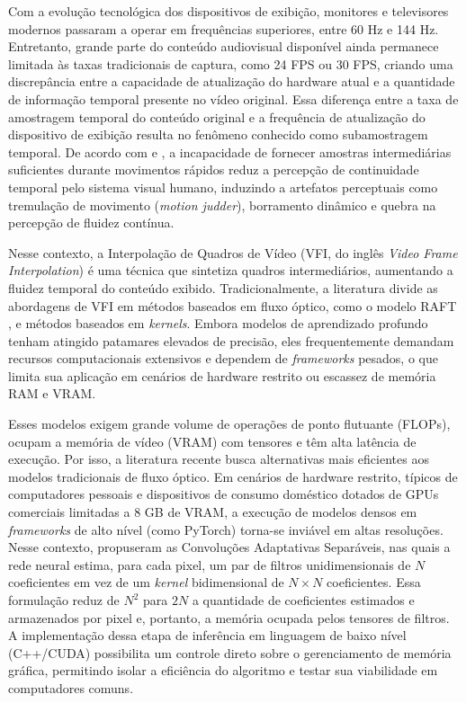 \documentclass[
    12pt,                %
    openright,           %
    oneside,             %
    a4paper,             %
    english,             %
    brazil               %
]{abntex2}
\begin{document}
Com a evolução tecnológica dos dispositivos de exibição, monitores e televisores modernos passaram a operar em frequências superiores, entre 60 Hz e 144 Hz. Entretanto, grande parte do conteúdo audiovisual disponível ainda permanece limitada às taxas tradicionais de captura, como 24 FPS ou 30 FPS, criando uma discrepância entre a capacidade de atualização do hardware atual e a quantidade de informação temporal presente no vídeo original. Essa diferença entre a taxa de amostragem temporal do conteúdo original e a frequência de atualização do dispositivo de exibição resulta no fenômeno conhecido como subamostragem temporal. De acordo com  e , a incapacidade de fornecer amostras intermediárias suficientes durante movimentos rápidos reduz a percepção de continuidade temporal pelo sistema visual humano, induzindo a artefatos perceptuais como tremulação de movimento (\textit{motion judder}), borramento dinâmico e quebra na percepção de fluidez contínua.

Nesse contexto, a Interpolação de Quadros de Vídeo (VFI, do inglês \textit{Video Frame Interpolation}) é uma técnica que sintetiza quadros intermediários, aumentando a fluidez temporal do conteúdo exibido. Tradicionalmente, a literatura divide as abordagens de VFI em métodos baseados em fluxo óptico, como o modelo RAFT \cite{Teed2020}, e métodos baseados em \textit{kernels}. Embora modelos de aprendizado profundo tenham atingido patamares elevados de precisão, eles frequentemente demandam recursos computacionais extensivos e dependem de \textit{frameworks} pesados, o que limita sua aplicação em cenários de hardware restrito ou escassez de memória RAM e VRAM.

Esses modelos exigem grande volume de operações de ponto flutuante (FLOPs), ocupam a memória de vídeo (VRAM) com tensores e têm alta latência de execução. Por isso, a literatura recente busca alternativas mais eficientes aos modelos tradicionais de fluxo óptico. Em cenários de hardware restrito, típicos de computadores pessoais e dispositivos de consumo doméstico dotados de GPUs comerciais limitadas a 8 GB de VRAM, a execução de modelos densos em \textit{frameworks} de alto nível (como PyTorch) torna-se inviável em altas resoluções. Nesse contexto,  propuseram as Convoluções Adaptativas Separáveis, nas quais a rede neural estima, para cada pixel, um par de filtros unidimensionais de $N$ coeficientes em vez de um \textit{kernel} bidimensional de $N \times N$ coeficientes. Essa formulação reduz de $N^2$ para $2N$ a quantidade de coeficientes estimados e armazenados por pixel e, portanto, a memória ocupada pelos tensores de filtros. A implementação dessa etapa de inferência em linguagem de baixo nível (C++/CUDA) possibilita um controle direto sobre o gerenciamento de memória gráfica, permitindo isolar a eficiência do algoritmo e testar sua viabilidade em computadores comuns.
\end{document}
